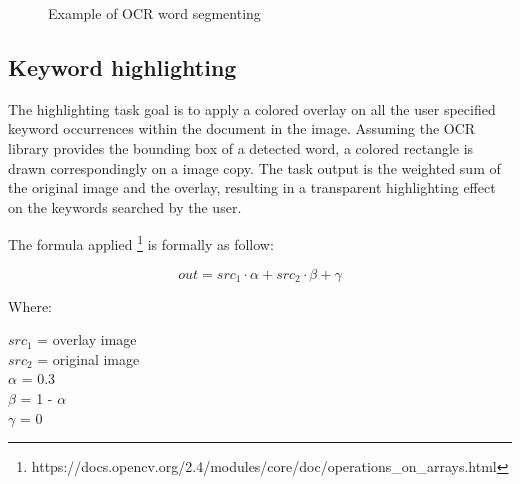 \documentclass[a4paper]{article}
\begin{document}
\begin{figure}[H]
	\caption{Example of OCR word segmenting}
	\label{fig:ocr}
\end{figure}

\subsection{Keyword highlighting}

The highlighting task goal is to apply a colored overlay on all the user specified keyword occurrences within the document in the image. Assuming the OCR library provides the bounding box of a detected word, a colored rectangle is drawn correspondingly on a image copy. The task output is the weighted sum of the original image and the overlay, resulting in a transparent highlighting effect on the keywords searched by the user. 

The formula applied \footnote{https://docs.opencv.org/2.4/modules/core/doc/operations\_on\_arrays.html} is formally as follow: %

\begin{equation}
	out = src_1 \cdot \alpha + src_2 \cdot \beta + \gamma
\end{equation}

Where:

\begin{center}
	$src_1$ = overlay image \\
	$src_2$ = original image \\
	$\alpha$ = 0.3  \\
	$\beta$ = 1 - $\alpha$ \\
	$\gamma$ = 0 
\end{center}
\end{document}
